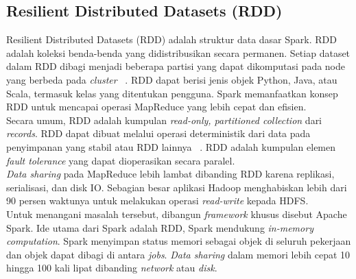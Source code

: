 \subsection{Resilient Distributed Datasets (RDD)}

Resilient Distributed Datasets (RDD) adalah struktur data dasar Spark. RDD adalah koleksi benda-benda yang didistribusikan secara permanen. Setiap dataset dalam RDD dibagi menjadi beberapa partisi yang dapat dikomputasi pada node yang berbeda pada \textit{cluster} ~\cite{holdenkarau:07:ls}. RDD dapat berisi jenis objek Python, Java, atau Scala, termasuk kelas yang ditentukan pengguna. Spark memanfaatkan konsep RDD untuk mencapai operasi MapReduce yang lebih cepat dan efisien. ~\cite{holdenkarau:07:ls}\\

Secara umum, RDD adalah kumpulan \textit{read-only, partitioned collection} dari \textit{records}. RDD dapat dibuat melalui operasi deterministik dari data pada penyimpanan yang stabil atau RDD lainnya ~\cite{holdenkarau:07:ls}. RDD adalah kumpulan elemen \textit{fault tolerance} yang dapat dioperasikan secara paralel.\\


\textit{Data sharing} pada MapReduce lebih lambat dibanding RDD  karena replikasi, serialisasi, dan disk IO. Sebagian besar aplikasi Hadoop menghabiskan lebih dari 90 persen waktunya untuk melakukan operasi \textit{read-write} kepada HDFS.\\

Untuk menangani masalah tersebut, dibangun \textit{framework} khusus disebut Apache Spark. Ide utama dari Spark adalah RDD, Spark mendukung \textit{in-memory computation}. Spark menyimpan status memori sebagai objek di seluruh pekerjaan dan objek dapat dibagi di antara \textit{jobs}. \textit{Data sharing} dalam memori lebih cepat 10 hingga 100 kali lipat dibanding \textit{network} atau \textit{disk}.\\

